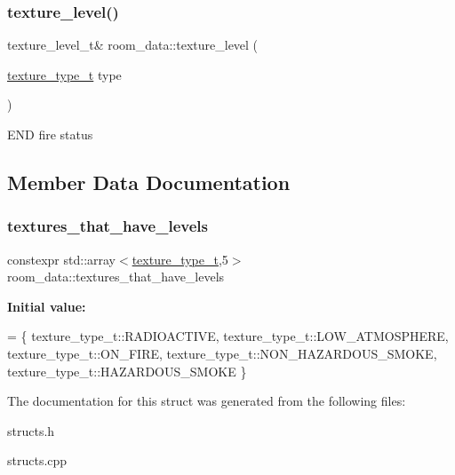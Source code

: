 \subsubsection{\texorpdfstring{texture\+\_\+level()}{texture\_level()}}
{\footnotesize\ttfamily texture\+\_\+level\+\_\+t\& room\+\_\+data\+::texture\+\_\+level (\begin{DoxyParamCaption}\item[{\hyperlink{structroom__data_a9552b46091ee649079e41f04f9543b8e}{texture\+\_\+type\+\_\+t}}]{type }\end{DoxyParamCaption})\hspace{0.3cm}{\ttfamily [inline]}}

E\+ND fire status 

\subsection{Member Data Documentation}
\mbox{\label{structroom__data_a153f9eb5c5c4d67bcf8ec85daedc8fa7}} 
\subsubsection{\texorpdfstring{textures\+\_\+that\+\_\+have\+\_\+levels}{textures\_that\_have\_levels}}
{\footnotesize\ttfamily constexpr std\+::array$<$\hyperlink{structroom__data_a9552b46091ee649079e41f04f9543b8e}{texture\+\_\+type\+\_\+t},5$>$ room\+\_\+data\+::textures\+\_\+that\+\_\+have\+\_\+levels\hspace{0.3cm}{\ttfamily [static]}}

{\bfseries Initial value\+:}
\begin{DoxyCode}
= \{
      texture\_type\_t::RADIOACTIVE,
      texture\_type\_t::LOW\_ATMOSPHERE,
      texture\_type\_t::ON\_FIRE,
      texture\_type\_t::NON\_HAZARDOUS\_SMOKE,
      texture\_type\_t::HAZARDOUS\_SMOKE
    \}
\end{DoxyCode}


The documentation for this struct was generated from the following files\+:\begin{DoxyCompactItemize}
\item 
structs.\+h\item 
structs.\+cpp\end{DoxyCompactItemize}
